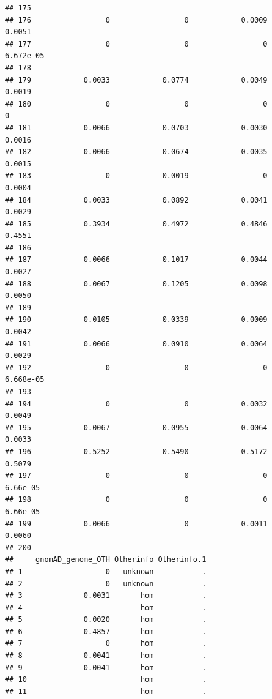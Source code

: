 \documentclass[
]{article}
\begin{document}
\begin{verbatim}
## 175                                                                        
## 176                 0                 0            0.0009            0.0051
## 177                 0                 0                 0         6.672e-05
## 178                                                                        
## 179            0.0033            0.0774            0.0049            0.0019
## 180                 0                 0                 0                 0
## 181            0.0066            0.0703            0.0030            0.0016
## 182            0.0066            0.0674            0.0035            0.0015
## 183                 0            0.0019                 0            0.0004
## 184            0.0033            0.0892            0.0041            0.0029
## 185            0.3934            0.4972            0.4846            0.4551
## 186                                                                        
## 187            0.0066            0.1017            0.0044            0.0027
## 188            0.0067            0.1205            0.0098            0.0050
## 189                                                                        
## 190            0.0105            0.0339            0.0009            0.0042
## 191            0.0066            0.0910            0.0064            0.0029
## 192                 0                 0                 0         6.668e-05
## 193                                                                        
## 194                 0                 0            0.0032            0.0049
## 195            0.0067            0.0955            0.0064            0.0033
## 196            0.5252            0.5490            0.5172            0.5079
## 197                 0                 0                 0          6.66e-05
## 198                 0                 0                 0          6.66e-05
## 199            0.0066                 0            0.0011            0.0060
## 200                                                                        
##     gnomAD_genome_OTH Otherinfo Otherinfo.1
## 1                   0   unknown           .
## 2                   0   unknown           .
## 3              0.0031       hom           .
## 4                           hom           .
## 5              0.0020       hom           .
## 6              0.4857       hom           .
## 7                   0       hom           .
## 8              0.0041       hom           .
## 9              0.0041       hom           .
## 10                          hom           .
## 11                          hom           .

\end{verbatim}
\end{document}
